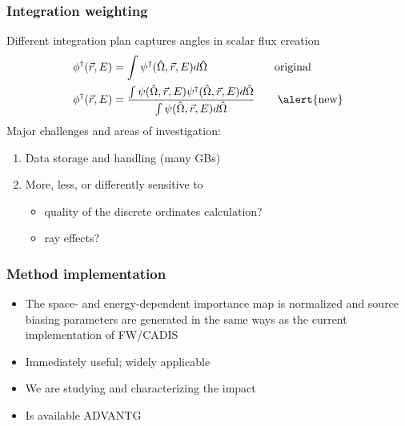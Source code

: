 \documentclass[xcolor=x11names,compress]{beamer}
\renewcommand{\(}{\begin{columns}}
\renewcommand{\)}{\end{columns}}
\newcommand{\<}[1]{\begin{column}{#1}}
\renewcommand{\>}{\end{column}}
\newcommand{\vOmega}{\ensuremath{\hat{\Omega}}}
\newcommand{\ve}[1]{\ensuremath{\vec{#1}}}
\begin{document}
\begin{frame}[fragile]
  \frametitle{Integration weighting}

    Different integration plan captures angles in scalar flux creation	
	\begin{align*}
		\phi^{\dagger}(\ve{r},E) &= \int \psi^{\dagger}(\vOmega, 
		\ve{r},E) d\vOmega \qquad  \qquad \qquad \text{original}\\
		\phi^{\dagger}(\ve{r},E) &= \frac{\int \psi(\vOmega, \ve{r},E)
		 \psi^{\dagger}(\vOmega, \ve{r},E) d\vOmega}{\int \psi(\vOmega, 
		 \ve{r},E)  d\vOmega} \qquad \text{\alert{new}}
	\end{align*}
    \pause
    Major challenges and areas of investigation:
	\begin{enumerate}
	\item Data storage and handling (many GBs)
	\item More, less, or differently sensitive to 
	  \begin{itemize}
	  \item quality of the discrete ordinates calculation?
	  \item ray effects?
	  \end{itemize}
	\end{enumerate}

\end{frame}


\begin{frame}[fragile]
  \frametitle{Method implementation}

  	\begin{itemize}
    \item The space- and energy-dependent importance map is normalized and 
     source biasing parameters are generated in the \alert{same ways} as
     the current implementation of FW/CADIS \vspace*{1 em}
	\item Immediately useful; widely applicable \vspace*{1 em}
	\item We are studying and characterizing the impact\vspace*{1 em}
	\item Is available ADVANTG \cite{mosher_new_2010}
	\end{itemize}
	
\end{frame}
\end{document}
